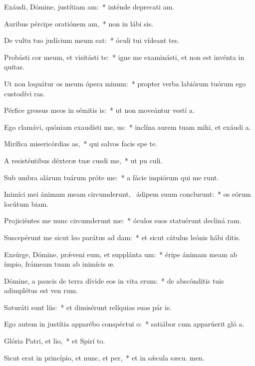\item Exáudi, Dómine, justítiam am:~* inténde deprecati am.
\item Auribus pércipe oratiónem am,~* non in lábi sis.
\item De vultu tuo judícium meum eat:~* óculi tui vídeant tes.
\item Probásti cor meum, et visitásti te:~* igne me examinásti, et non est invénta in  quitas.
\item Ut non loquátur os meum ópera minum:~* propter verba labiórum tuórum ego custodívi  ras.
\item Pérfice gressus meos in sémitis is:~* ut non moveántur vestí a.
\item Ego clamávi, quóniam exaudísti me, us:~* inclína aurem tuam mihi, et exáudi  a.
\item Mirífica misericórdias as,~* qui salvos facis spe  te.
\item A resisténtibus déxteræ tuæ cusdi me,~* ut pu culi.
\item Sub umbra alárum tuárum próte me:~* a fácie impiórum qui me runt.
\item Inimíci mei ánimam meam circumderunt,~\pscross{} ádipem suum conclurunt:~* os eórum locútum  biam.
\item Projiciéntes me nunc circumderunt me:~* óculos suos statuérunt decliná  ram.
\item Suscepérunt me sicut leo parátus ad dam:~* et sicut cátulus leónis hábi  ditis.
\item Exsúrge, Dómine, prǽveni eum, et supplánta um:~* éripe ánimam meam ab ímpio, frámeam tuam ab inimícis  æ.
\item Dómine, a paucis de terra dívide eos in vita erum:~* de abscónditis tuis adimplétus est ven rum.
\item Saturáti sunt liis:~* et dimisérunt relíquias suas pár is.
\item Ego autem in justítia apparébo conspéctui o:~* satiábor cum apparúerit gló a.
\item Glória Patri, et lio,~* et Spirí to.
\item Sicut erat in princípio, et nunc, et per,~* et in sǽcula sæcu. men.
